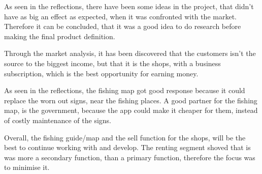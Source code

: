 As seen in the reflections, there have been some ideas in the project, that didn't have as big an effect as expected, when it was confronted with the market. Therefore it can be concluded, that it was a good idea to do research before making the final product definition.   


Through the market analysis, it has been discovered that the customers isn’t the source to the biggest income, but that it is the shops, with a business subscription, which is the best opportunity for earning money. 


As seen in the reflections, the fishing map got good response because it could replace the worn out signs, near the fishing places. A good partner for the fishing map, is the government, because the app could make it cheaper for them, instead of costly maintenance of the signs. 


Overall, the fishing guide/map and the sell function for the shops, will be the best to continue working with and develop. The renting segment shoved that is was more a secondary function, than a primary function, therefore the focus was to minimise it. 
